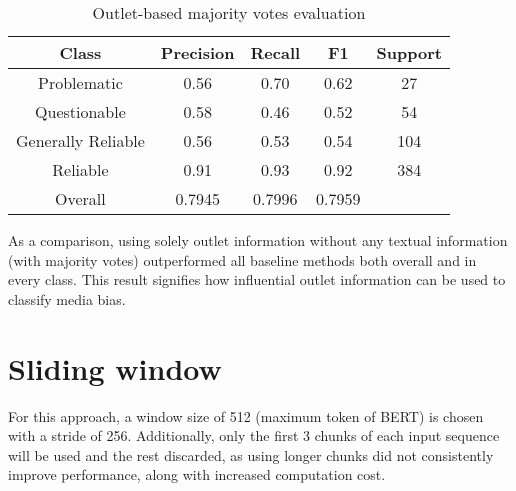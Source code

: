 \begin{table}[htbp]
    \centering
    \begin{tabular}{|| c | c | c | c | c ||}
        \hline
        Class              & Precision & Recall & F1     & Support \\
        \hline
        \hline
        Problematic        & 0.56      & 0.70   & 0.62   & 27      \\
        \hline
        Questionable       & 0.58      & 0.46   & 0.52   & 54      \\
        \hline
        Generally Reliable & 0.56      & 0.53   & 0.54   & 104     \\
        \hline
        Reliable           & 0.91      & 0.93   & 0.92   & 384     \\
        \hline
        Overall            & 0.7945    & 0.7996 & 0.7959 &         \\
        \hline
    \end{tabular}
    \caption{Outlet-based majority votes evaluation}
    \label{table:majority-votes-eval}
\end{table}



As a comparison, using solely outlet information without any textual information (with majority votes) outperformed all baseline methods both overall and in every class. This result signifies how influential outlet information can be used to classify media bias.

\begin{comment}
Find out why TF-IDF performs worse on class problematic
\end{comment}


\section{Sliding window}

For this approach, a window size of 512 (maximum token of BERT) is chosen with a stride of 256. Additionally, only the first 3 chunks of each input sequence will be used and the rest discarded, as using longer chunks did not consistently improve performance, along with increased computation cost.


